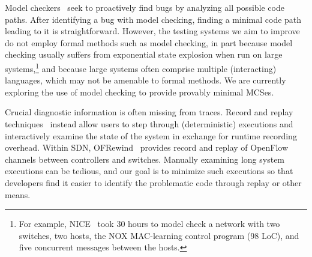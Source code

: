 Model checkers~\cite{musuvathi2008finding,nice} seek to
proactively find bugs by analyzing all possible code paths.
After identifying a bug with model checking, finding a minimal code path leading to it is
straightforward. However, the testing systems we aim to improve do not employ
formal methods such as model checking, in part because model checking usually suffers from exponential
state explosion when run on large systems,\footnote{For example, NICE~\cite{nice} took 30 hours to
model check a network with two switches, two hosts, the NOX MAC-learning
control program (98 LoC), and five concurrent
messages between the hosts.} and because large systems often comprise
multiple (interacting) languages, which may not be amenable to formal methods.
We are currently exploring the use of model checking to provide provably
minimal MCSes.

\vspace{0.05in}
 Crucial diagnostic information is often missing from traces.
Record and replay techniques~\cite{Geels:2006:RDD:1267359.1267386,lin2013defined}
instead allow users to step through (deterministic) executions and interactively examine the
state of the system in exchange for runtime recording overhead.
Within SDN, OFRewind~\cite{ofrewind} provides
record and replay of OpenFlow channels between controllers and switches.
Manually examining long system executions can be tedious, and our goal is to
minimize such executions so that developers find it easier to identify the
problematic code through replay or other means.

